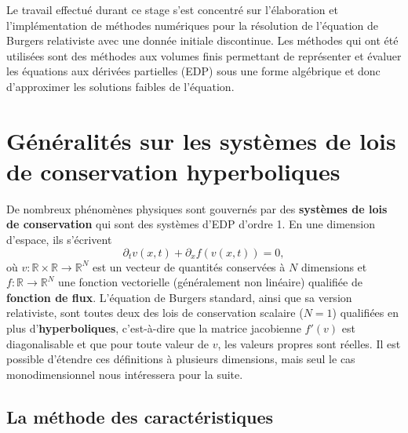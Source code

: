 \documentclass[11pt,a4paper]{article}
\begin{document}
Le travail effectué durant ce stage s'est concentré sur l'élaboration et l'implémentation de méthodes numériques pour la résolution de l'équation de Burgers relativiste avec une donnée initiale discontinue. Les méthodes qui ont été utilisées sont des méthodes aux volumes finis permettant de représenter et évaluer les équations aux dérivées partielles (EDP) sous une forme algébrique et donc d'approximer les solutions faibles de l'équation.

\section{Généralités sur les systèmes de lois de conservation hyperboliques}

De nombreux phénomènes physiques sont gouvernés par des \textbf{systèmes de lois de conservation} qui sont des systèmes d'EDP d'ordre 1. En une dimension d'espace, ils s'écrivent
\begin{equation}\label{loi_de_conservation}
	\partial_t v(x,t) + \partial_x f(v(x,t)) = 0,
\end{equation}
où $v : \mathbb{R}\times\mathbb{R} \rightarrow \mathbb{R}^N$ est un vecteur de quantités conservées à $N$ dimensions et $f : \mathbb{R} \rightarrow \mathbb{R}^N$ une fonction vectorielle (généralement non linéaire) qualifiée de \textbf{fonction de flux}. L'équation de Burgers standard, ainsi que sa version relativiste, sont toutes deux des lois de conservation scalaire ($N=1$) qualifiées en plus d'\textbf{hyperboliques}, c'est-à-dire que la matrice jacobienne $f'(v)$ est diagonalisable et que pour toute valeur de $v$, les valeurs propres sont réelles. Il est possible d'étendre ces définitions à plusieurs dimensions, mais seul le cas monodimensionnel nous intéressera pour la suite.

\subsection{La méthode des caractéristiques}\label{subsec:caracteristique}
\end{document}

